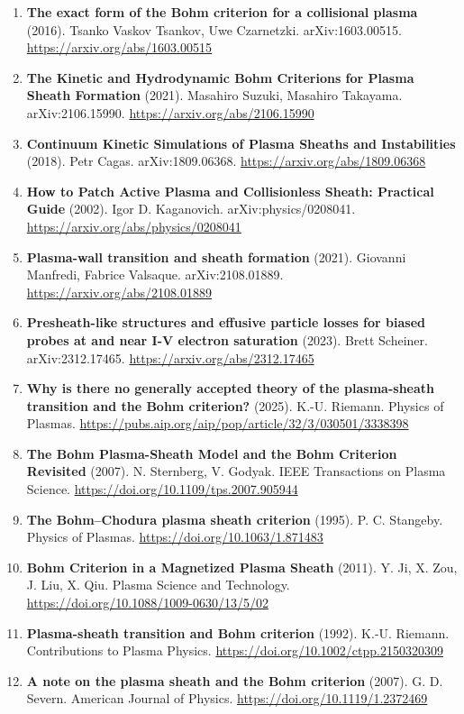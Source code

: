 \documentclass[11pt,a4paper]{article}
\begin{document}
\begin{enumerate}[leftmargin=1.4em]
\item \textbf{The exact form of the Bohm criterion for a collisional plasma} (2016). Tsanko Vaskov Tsankov, Uwe Czarnetzki. arXiv:1603.00515. \url{https://arxiv.org/abs/1603.00515}
\item \textbf{The Kinetic and Hydrodynamic Bohm Criterions for Plasma Sheath Formation} (2021). Masahiro Suzuki, Masahiro Takayama. arXiv:2106.15990. \url{https://arxiv.org/abs/2106.15990}
\item \textbf{Continuum Kinetic Simulations of Plasma Sheaths and Instabilities} (2018). Petr Cagas. arXiv:1809.06368. \url{https://arxiv.org/abs/1809.06368}
\item \textbf{How to Patch Active Plasma and Collisionless Sheath: Practical Guide} (2002). Igor D. Kaganovich. arXiv:physics/0208041. \url{https://arxiv.org/abs/physics/0208041}
\item \textbf{Plasma-wall transition and sheath formation} (2021). Giovanni Manfredi, Fabrice Valsaque. arXiv:2108.01889. \url{https://arxiv.org/abs/2108.01889}
\item \textbf{Presheath-like structures and effusive particle losses for biased probes at and near I-V electron saturation} (2023). Brett Scheiner. arXiv:2312.17465. \url{https://arxiv.org/abs/2312.17465}
\item \textbf{Why is there no generally accepted theory of the plasma-sheath transition and the Bohm criterion?} (2025). K.-U. Riemann. Physics of Plasmas. \url{https://pubs.aip.org/aip/pop/article/32/3/030501/3338398}
\item \textbf{The Bohm Plasma-Sheath Model and the Bohm Criterion Revisited} (2007). N. Sternberg, V. Godyak. IEEE Transactions on Plasma Science. \url{https://doi.org/10.1109/tps.2007.905944}
\item \textbf{The Bohm–Chodura plasma sheath criterion} (1995). P. C. Stangeby. Physics of Plasmas. \url{https://doi.org/10.1063/1.871483}
\item \textbf{Bohm Criterion in a Magnetized Plasma Sheath} (2011). Y. Ji, X. Zou, J. Liu, X. Qiu. Plasma Science and Technology. \url{https://doi.org/10.1088/1009-0630/13/5/02}
\item \textbf{Plasma-sheath transition and Bohm criterion} (1992). K.-U. Riemann. Contributions to Plasma Physics. \url{https://doi.org/10.1002/ctpp.2150320309}
\item \textbf{A note on the plasma sheath and the Bohm criterion} (2007). G. D. Severn. American Journal of Physics. \url{https://doi.org/10.1119/1.2372469}

\end{enumerate}
\end{document}
